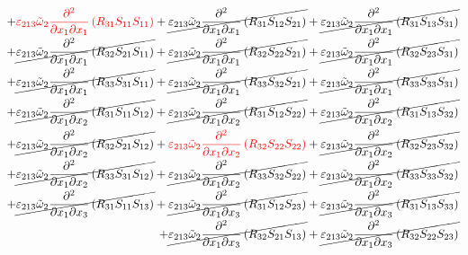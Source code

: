 \begin{equation}
	\begin{split}
		+{\color{red}\varepsilon_{213}\tilde{\omega}_{2}\pdv{}{x_{1}}{x_{1}}\left(R_{31}S_{11}S_{11}\right)}
		+\cancel{\varepsilon_{213}\tilde{\omega}_{2}\pdv{}{x_{1}}{x_{1}}\left(R_{31}S_{12}S_{21}\right)}
		+\cancel{\varepsilon_{213}\tilde{\omega}_{2}\pdv{}{x_{1}}{x_{1}}\left(R_{31}S_{13}S_{31}\right)}\\
		+\cancel{\varepsilon_{213}\tilde{\omega}_{2}\pdv{}{x_{1}}{x_{1}}\left(R_{32}S_{21}S_{11}\right)}
		+\cancel{\varepsilon_{213}\tilde{\omega}_{2}\pdv{}{x_{1}}{x_{1}}\left(R_{32}S_{22}S_{21}\right)}
		+\cancel{\varepsilon_{213}\tilde{\omega}_{2}\pdv{}{x_{1}}{x_{1}}\left(R_{32}S_{23}S_{31}\right)}\\
		+\cancel{\varepsilon_{213}\tilde{\omega}_{2}\pdv{}{x_{1}}{x_{1}}\left(R_{33}S_{31}S_{11}\right)}
		+\cancel{\varepsilon_{213}\tilde{\omega}_{2}\pdv{}{x_{1}}{x_{1}}\left(R_{33}S_{32}S_{21}\right)}
		+\cancel{\varepsilon_{213}\tilde{\omega}_{2}\pdv{}{x_{1}}{x_{1}}\left(R_{33}S_{33}S_{31}\right)}\\
		+\cancel{\varepsilon_{213}\tilde{\omega}_{2}\pdv{}{x_{1}}{x_{2}}\left(R_{31}S_{11}S_{12}\right)}
		+\cancel{\varepsilon_{213}\tilde{\omega}_{2}\pdv{}{x_{1}}{x_{2}}\left(R_{31}S_{12}S_{22}\right)}
		+\cancel{\varepsilon_{213}\tilde{\omega}_{2}\pdv{}{x_{1}}{x_{2}}\left(R_{31}S_{13}S_{32}\right)}\\
		+\cancel{\varepsilon_{213}\tilde{\omega}_{2}\pdv{}{x_{1}}{x_{2}}\left(R_{32}S_{21}S_{12}\right)}
		+{\color{red}\varepsilon_{213}\tilde{\omega}_{2}\pdv{}{x_{1}}{x_{2}}\left(R_{32}S_{22}S_{22}\right)}
		+\cancel{\varepsilon_{213}\tilde{\omega}_{2}\pdv{}{x_{1}}{x_{2}}\left(R_{32}S_{23}S_{32}\right)}\\
		+\cancel{\varepsilon_{213}\tilde{\omega}_{2}\pdv{}{x_{1}}{x_{2}}\left(R_{33}S_{31}S_{12}\right)}
		+\cancel{\varepsilon_{213}\tilde{\omega}_{2}\pdv{}{x_{1}}{x_{2}}\left(R_{33}S_{32}S_{22}\right)}
		+\cancel{\varepsilon_{213}\tilde{\omega}_{2}\pdv{}{x_{1}}{x_{2}}\left(R_{33}S_{33}S_{32}\right)}\\
		+\cancel{\varepsilon_{213}\tilde{\omega}_{2}\pdv{}{x_{1}}{x_{3}}\left(R_{31}S_{11}S_{13}\right)}
		+\cancel{\varepsilon_{213}\tilde{\omega}_{2}\pdv{}{x_{1}}{x_{3}}\left(R_{31}S_{12}S_{23}\right)}
		+\cancel{\varepsilon_{213}\tilde{\omega}_{2}\pdv{}{x_{1}}{x_{3}}\left(R_{31}S_{13}S_{33}\right)}\\
		+\cancel{\varepsilon_{213}\tilde{\omega}_{2}\pdv{}{x_{1}}{x_{3}}\left(R_{32}S_{21}S_{13}\right)}
		+\cancel{\varepsilon_{213}\tilde{\omega}_{2}\pdv{}{x_{1}}{x_{3}}\left(R_{32}S_{22}S_{23}\right)}

\end{split}
\end{equation}
